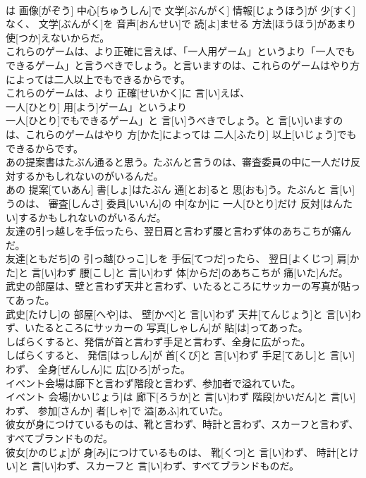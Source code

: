 \documentclass[8pt]{extreport}
\begin{document}
\begin{CJK}{UTF8}{min}
\\	は 画像[がぞう] 中心[ちゅうしん]で 文学[ぶんがく] 情報[じょうほう]が 少[すく]なく、 文学[ぶんがく]を 音声[おんせい]で 読[よ]ませる 方法[ほうほう]があまり 使[つか]えないからだ。
\\	これらのゲームは、より正確に言えば、「一人用ゲーム」というより「一人でもできるゲーム」と言うべきでしょう。と言いますのは、これらのゲームはやり方によっては二人以上でもできるからです。	
\\	これらのゲームは、より 正確[せいかく]に 言[い]えば、
\\	一人[ひとり] 用[よう]ゲーム」というより
\\	一人[ひとり]でもできるゲーム」と 言[い]うべきでしょう。と 言[い]いますのは、これらのゲームはやり 方[かた]によっては 二人[ふたり] 以上[いじょう]でもできるからです。
\\	あの提案書はたぶん通ると思う。たぶんと言うのは、審査委員の中に一人だけ反対するかもしれないのがいるんだ。	
\\	あの 提案[ていあん] 書[しょ]はたぶん 通[とお]ると 思[おも]う。たぶんと 言[い]うのは、 審査[しんさ] 委員[いいん]の 中[なか]に 一人[ひとり]だけ 反対[はんたい]するかもしれないのがいるんだ。
\\	友達の引っ越しを手伝ったら、翌日肩と言わず腰と言わず体のあちこちが痛んだ。	
\\	友達[ともだち]の 引っ越[ひっこ]しを 手伝[てつだ]ったら、 翌日[よくじつ] 肩[かた]と 言[い]わず 腰[こし]と 言[い]わず 体[からだ]のあちこちが 痛[いた]んだ。
\\	武史の部屋は、壁と言わず天井と言わず、いたるところにサッカーの写真が貼ってあった。	
\\	武史[たけし]の 部屋[へや]は、 壁[かべ]と 言[い]わず 天井[てんじょう]と 言[い]わず、いたるところにサッカーの 写真[しゃしん]が 貼[は]ってあった。
\\	しばらくすると、発信が首と言わず手足と言わず、全身に広がった。	
\\	しばらくすると、 発信[はっしん]が 首[くび]と 言[い]わず 手足[てあし]と 言[い]わず、 全身[ぜんしん]に 広[ひろ]がった。
\\	イベント会場は廊下と言わず階段と言わず、参加者で溢れていた。	
\\	イベント 会場[かいじょう]は 廊下[ろうか]と 言[い]わず 階段[かいだん]と 言[い]わず、 参加[さんか] 者[しゃ]で 溢[あふ]れていた。
\\	彼女が身につけているものは、靴と言わず、時計と言わず、スカーフと言わず、すべてブランドものだ。	
\\	彼女[かのじょ]が 身[み]につけているものは、 靴[くつ]と 言[い]わず、 時計[とけい]と 言[い]わず、スカーフと 言[い]わず、すべてブランドものだ。

\end{CJK}
\end{document}
